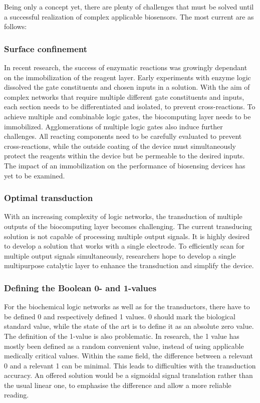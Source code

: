 \documentclass[runningheads]{llncs}
\begin{document}
Being only a concept yet, there are plenty of challenges that must be solved until a successful realization of complex applicable biosensors. The most current are as follows:

\subsubsection{Surface confinement}	In recent research, the success of enzymatic reactions was growingly dependant on the immobilization of the reagent layer. Early experiments with enzyme logic dissolved the gate constituents and chosen inputs in a solution. With the aim of complex networks that require multiple different gate constituents and inputs, each section needs to be differentiated and isolated, to prevent cross-reactions. To achieve multiple and combinable logic gates, the biocomputing layer needs to be immobilized. Agglomerations of multiple logic gates also induce further challenges. All reacting components need to be carefully evaluated to prevent cross-reactions, while the outside coating of the device must simultaneously protect the reagents within the device but be permeable to the desired inputs. The impact of an immobilization on the performance of biosensing devices has yet to be examined. \cite{original}

\subsubsection{Optimal transduction} With an increasing complexity of logic networks, the transduction of multiple outputs of the biocomputing layer becomes challenging. The current transducing solution is not capable of processing multiple output signals. It is highly desired to develop a solution that works with a single electrode. To efficiently scan for multiple output signals simultaneously, researchers hope to develop a single multipurpose catalytic layer to enhance the transduction and simplify the device. \cite{original}

\subsubsection{Defining the Boolean 0- and 1-values} For the biochemical logic networks as well as for the transductors, there have to be defined 0 and respectively defined 1 values. 0 should mark the biological standard value, while the state of the art is to define it as an absolute zero value. The definition of the 1-value is also problematic. In research, the 1 value has mostly been defined as a random convenient value, instead of using applicable medically critical values. Within the same field, the difference between a relevant 0 and a relevant 1 can be minimal. This leads to difficulties with the transduction accuracy. An offered solution would be a sigmoidal signal translation rather than the usual linear one, to emphasise the difference and allow a more reliable reading. 
\end{document}

